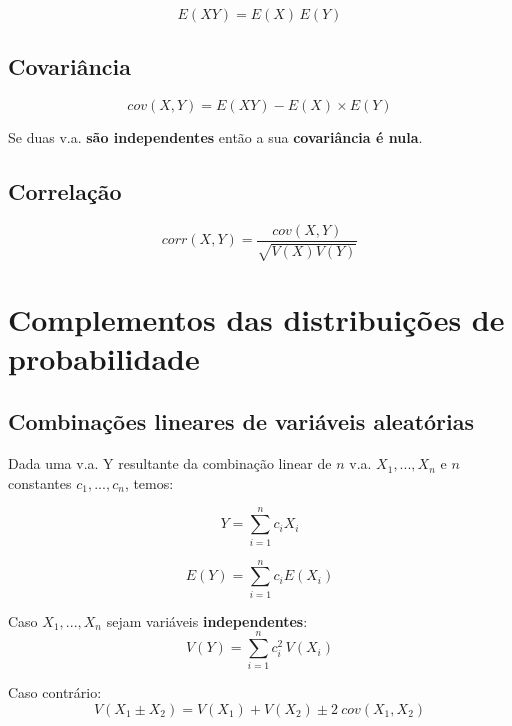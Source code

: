\documentclass[11pt, a4paper]{article}
\begin{document}
\begin{equation*}
    E(XY) = E(X) \, E(Y)
\end{equation*}

\subsection{Covariância}

\begin{equation*}
    cov(X,Y) = E(XY) - E(X) \times E(Y)
\end{equation*}

Se duas v.a. \textbf{são independentes} então a sua \textbf{covariância é nula}.

\subsection{Correlação}

\begin{equation*}
    corr(X,Y) = \frac{cov(X,Y)}{\sqrt{V(X) V(Y)}}
\end{equation*}

\newpage
\section{Complementos das distribuições de probabilidade}

\subsection{Combinações lineares de variáveis aleatórias}

Dada uma v.a. Y resultante da combinação linear de $n$ v.a. $X_1, ..., X_n$ e $n$ constantes $c_1, ..., c_n$, temos:

\begin{equation*}
    Y = \sum_{i=1}^{n} c_i X_i
\end{equation*}

\begin{equation*}
    E(Y) = \sum_{i=1}^{n} c_i E(X_i)
\end{equation*}

Caso $X_1, ..., X_n$ sejam variáveis \textbf{independentes}:
\begin{equation*}
    V(Y) =  \sum_{i=1}^{n} c_i^2 \, V(X_i)
\end{equation*}

Caso contrário:
\begin{equation*}
    V(X_1 \pm X_2) = V(X_1) + V(X_2) \pm 2 \ cov(X_1, X_2)
\end{equation*}
\end{document}
